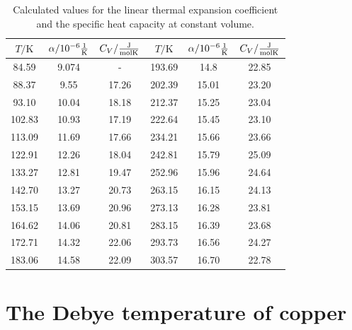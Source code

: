 \begin{table}[htbp] 
    \centering 
    \begin{tabular}{cc c| ccc} 
        \toprule $T/\unit{\kelvin}$ & $\alpha/\unit{10^{-6}\frac{1}{\kelvin}}$ & $C_V / \unit{\frac{\joule}{\mol\kelvin}} $ & $T/\unit{\kelvin}$ & $\alpha/\unit{10^{-6}\frac{1}{\kelvin}}$ & $C_V / \unit{\frac{\joule}{\mol\kelvin}} $\\ 
        \midrule 
        84.59  & 9.074 & - & 193.69 &  14.8 &  22.85  \\   
        88.37  & 9.55  & 17.26 & 202.39 & 15.01 & 23.20    \\
        93.10  & 10.04 & 18.18  & 212.37 & 15.25 & 23.04     \\
        102.83 & 10.93 & 17.19  & 222.64 & 15.45 & 23.10    \\
        113.09 & 11.69 & 17.66  & 234.21 & 15.66 & 23.66     \\
        122.91 & 12.26 & 18.04 & 242.81 & 15.79 & 25.09    \\
        133.27 & 12.81 & 19.47  & 252.96 & 15.96 & 24.64     \\
        142.70 & 13.27 & 20.73  & 263.15 & 16.15 & 24.13    \\
        153.15 & 13.69 & 20.96  & 273.13 & 16.28 & 23.81 \\
        164.62 & 14.06 & 20.81 & 283.15 & 16.39 & 23.68     \\
        172.71 & 14.32 & 22.06  & 293.73 & 16.56 & 24.27    \\
        183.06 & 14.58 & 22.09 & 303.57 & 16.70 &  22.78   \\

        \bottomrule 
    \end{tabular} 
    \caption[Tabelle]{Calculated values for the linear thermal expansion coefficient and the specific heat capacity at constant volume.} 
    \label{tab:cv} 
\end{table}

\section{The Debye temperature of copper}


